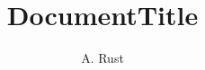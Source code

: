 \documentclass[11pt,english,twoside]{article}
\author{A. Rust}
\begin{document}
\title{DocumentTitle}
\makekatdocbeginning
\end{document}
